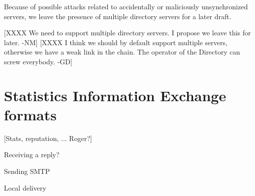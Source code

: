 Because of possible attacks related to accidentally or maliciously
unsynchronized servers, we leave the presence of multiple directory
servers for a later draft.

[XXXX We need to support multiple directory servers. I propose we
   leave this for later. -NM]
[XXXX I think we should by default support multiple servers, otherwise
   we have a weak link in the chain. The operator of the Directory can
   screw everybody. -GD]

\section{Statistics Information Exchange formats}

[Stats, reputation, ... Roger?]

Receiving a reply?

Sending SMTP

Local delivery

